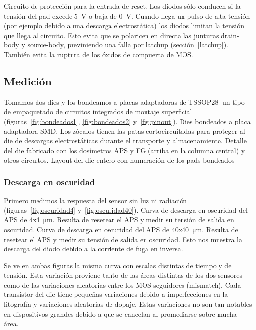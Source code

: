 {Circuito de protección para la entrada de reset.
Los diodos sólo conducen si la tensión del pad excede \SI{5}{\volt} o
baja de \SI{0}{\volt}.
Cuando llega un pulso de alta tensión
(por ejemplo debido a una descarga electrostática)
los diodos limitan la tensión que llega al circuito.
Esto evita que se polaricen en directa las junturas drain-body y source-body,
previniendo una falla por latchup (sección~\ref{latchup}).
También evita la ruptura de los óxidos de compuerta de MOS.}
\subsection{Medición}
Tomamos dos dies y los bondeamos a placas adaptadoras de TSSOP28,
un tipo de empaquetado de circuitos integrados de montaje superficial
(figuras~\ref{fig:bondeados1}, \ref{fig:bondeados2} y~\ref{fig:pinout}).
{Dies bondeados a placa adaptadora SMD.
Los zócalos tienen las patas cortocircuitadas para proteger al die de
descargas electrostáticas durante el transporte y almacenamiento.}
{Detalle del die fabricado con los dosímetros APS y FG 
(arriba en la columna central)
y otros circuitos.}
{Layout del die entero con numeración de los pads bondeados}
\subsubsection{Descarga en oscuridad}
Primero medimos la respuesta del sensor sin luz ni radiación
(figuras~\ref{fig:oscuridad4} y~\ref{fig:oscuridad40}).
{Curva de descarga en oscuridad del APS de 4x\SI{4}{\micro\meter}.
Resulta de resetear el APS y medir su tensión de salida en oscuridad.}
{Curva de descarga en oscuridad del APS de 40x\SI{40}{\micro\meter}.
Resulta de resetear el APS y medir su tensión de salida en oscuridad.}
Esto nos muestra la descarga del diodo debido a la corriente de fuga en
inversa.

Se ve en ambas figuras la misma curva 
con escalas distintas de tiempo y de tensión.
Esta variación proviene tanto de las áreas distintas de los dos sensores
como de las variaciones aleatorias entre los MOS seguidores (mismatch).
Cada transistor del die tiene pequeñas variaciones debido a imperfecciones en
la litografía y variaciones aleatorias de dopaje.
Estas variaciones no son tan notables en dispositivos grandes debido a que
se cancelan al promediarse sobre mucha área.

